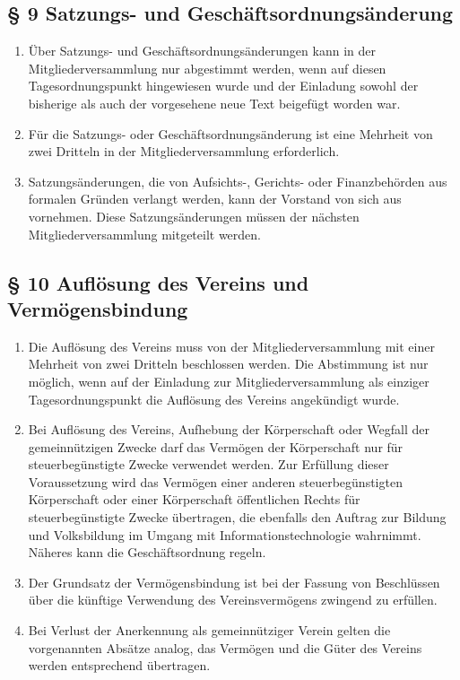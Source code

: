 ﻿\documentclass[10pt,a4paper]{scrartcl}
\begin{document}
%
%
\subsection*{§ 9 Satzungs- und Geschäftsordnungsänderung}
\begin{enumerate}
        \item Über Satzungs- und Geschäftsordnungsänderungen kann in der Mitgliederversammlung
                nur abgestimmt werden, wenn auf diesen Tagesordnungspunkt hingewiesen wurde und der
                Einladung sowohl der bisherige als auch der vorgesehene neue Text beigefügt
                worden war.
        \item Für die Satzungs- oder Geschäftsordnungsänderung ist eine Mehrheit von zwei
                Dritteln in der Mitgliederversammlung erforderlich.
        \item Satzungsänderungen, die von Aufsichts-, Gerichts- oder Finanz\-be\-hör\-den aus formalen
                Grün\-den verlangt werden, kann der Vorstand von sich aus vornehmen. Diese
                Sat\-zungs\-än\-der\-ung\-en müs\-sen der nächs\-ten Mitgliederversammlung mitgeteilt
                werden.
\end{enumerate}
%
%
\subsection*{§ 10 Auflösung des Vereins und Vermögensbindung}
\begin{enumerate}
        \item Die Auflösung des Vereins muss von der Mitgliederversammlung mit einer Mehrheit von
                zwei Dritteln beschlossen werden. Die Abstimmung ist nur möglich, wenn auf der Einladung
                zur Mitgliederversammlung als einziger Tagesordnungspunkt die Auflösung des Vereins
                angekündigt wurde.
        \item Bei Auflösung des Vereins, Aufhebung der Körperschaft oder Wegfall der
                gemeinnützigen Zwecke darf das Vermögen der Körperschaft nur für
                steuerbegünstigte Zwecke verwendet werden. Zur Erfüllung dieser
                Voraussetzung wird das Vermögen einer anderen steu\-er\-be\-güns\-tig\-ten
                Körperschaft oder einer Körperschaft öffentlichen Rechts für
                steuerbegünstigte Zwecke über\-tra\-gen, die ebenfalls den Auftrag
                zur Bildung und Volksbildung im Umgang mit Informationstechnologie
                wahrnimmt. Nä\-he\-res kann die Geschäftsordnung regeln.
        \item Der Grundsatz der Vermögensbindung ist bei der Fassung von
                Beschlüssen über die künf\-ti\-ge Verwendung des Vereinsvermögens zwingend
                zu erfüllen.
        \item Bei Verlust der Anerkennung als gemeinnütziger Verein gelten die vorgenannten Absätze analog, 
                das Vermögen und die Güter des Vereins werden entsprechend übertragen.
\end{enumerate}
%
%
\end{document}
